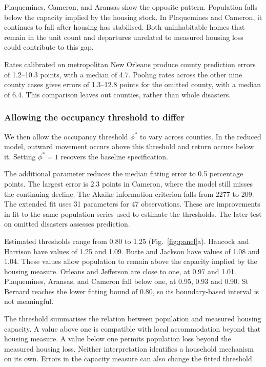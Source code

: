 \documentclass[11pt]{article}
\begin{document}
Plaquemines, Cameron, and Aransas show the opposite pattern. Population falls below the capacity implied by the housing stock. In Plaquemines and Cameron, it continues to fall after housing has stabilised. Both uninhabitable homes that remain in the unit count and departures unrelated to measured housing loss could contribute to this gap.

Rates calibrated on metropolitan New Orleans produce county prediction errors of 1.2--10.3 points, with a median of 4.7. Pooling rates across the other nine county cases gives errors of 1.3--12.8 points for the omitted county, with a median of 6.4. This comparison leaves out counties, rather than whole disasters.

\subsubsection{Allowing the occupancy threshold to differ}
We then allow the occupancy threshold $\phi^*$ to vary across counties. In the reduced model, outward movement occurs above this threshold and return occurs below it. Setting $\phi^*=1$ recovers the baseline specification.

The additional parameter reduces the median fitting error to 0.5 percentage points. The largest error is 2.3 points in Cameron, where the model still misses the continuing decline. The Akaike information criterion falls from 2277 to 209. The extended fit uses 31 parameters for 47 observations. These are improvements in fit to the same population series used to estimate the thresholds. The later test on omitted disasters assesses prediction.

Estimated thresholds range from 0.80 to 1.25 (Fig.~\ref{fig:panel}a). Hancock and Harrison have values of 1.25 and 1.09. Butte and Jackson have values of 1.08 and 1.04. These values allow population to remain above the capacity implied by the housing measure. Orleans and Jefferson are close to one, at 0.97 and 1.01. Plaquemines, Aransas, and Cameron fall below one, at 0.95, 0.93 and 0.90. St Bernard reaches the lower fitting bound of 0.80, so its boundary-based interval is not meaningful.

The threshold summarises the relation between population and measured housing capacity. A value above one is compatible with local accommodation beyond that housing measure. A value below one permits population loss beyond the measured housing loss. Neither interpretation identifies a household mechanism on its own. Errors in the capacity measure can also change the fitted threshold.
\end{document}

